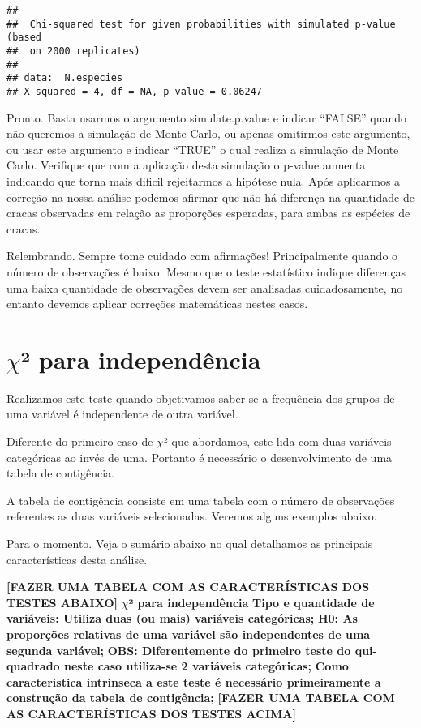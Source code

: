 \documentclass[titlepage, oneside, openany, a4paper]{book}
\begin{document}
\begin{verbatim}
## 
##  Chi-squared test for given probabilities with simulated p-value (based
##  on 2000 replicates)
## 
## data:  N.especies
## X-squared = 4, df = NA, p-value = 0.06247
\end{verbatim}

Pronto. Basta usarmos o argumento simulate.p.value e indicar ``FALSE'' quando não queremos a simulação de Monte Carlo, ou apenas omitirmos este argumento, ou usar este argumento e indicar ``TRUE'' o qual realiza a simulação de Monte Carlo. Verifique que com a aplicação desta simulação o p-value aumenta indicando que torna mais dificil rejeitarmos a hipótese nula. Após aplicarmos a correção na nossa análise podemos afirmar que não há diferença na quantidade de cracas observadas em relação as proporções esperadas, para ambas as espécies de cracas.

Relembrando. Sempre tome cuidado com afirmações! Principalmente quando o número de observações é baixo. Mesmo que o teste estatístico indique diferenças uma baixa quantidade de observações devem ser analisadas cuidadosamente, no entanto devemos aplicar correções matemáticas nestes casos.

\hypertarget{chi-para-independuxeancia}{%
\section{\texorpdfstring{\(\chi\)² para independência}{\textbackslash{}chi² para independência}}\label{chi-para-independuxeancia}}

Realizamos este teste quando objetivamos saber se a frequência dos grupos de uma variável é independente de outra variável.

Diferente do primeiro caso de \(\chi\)² que abordamos, este lida com duas variáveis categóricas ao invés de uma. Portanto é necessário o desenvolvimento de uma tabela de contigência.

A tabela de contigência consiste em uma tabela com o número de observações referentes as duas variáveis selecionadas. Veremos alguns exemplos abaixo.

Para o momento. Veja o sumário abaixo no qual detalhamos as principais características desta análise.

\textbf{{[}FAZER UMA TABELA COM AS CARACTERÍSTICAS DOS TESTES ABAIXO{]}}
\textbf{\(\chi\)² para independência}
\textbf{Tipo e quantidade de variáveis: Utiliza duas (ou mais) variáveis categóricas;}
\textbf{H0: As proporções relativas de uma variável são independentes de uma segunda variável;}
\textbf{OBS: Diferentemente do primeiro teste do qui-quadrado neste caso utiliza-se 2 variáveis categóricas;}
\textbf{Como caracteristica intrinseca a este teste é necessário primeiramente a construção da tabela de contigência;}
\textbf{{[}FAZER UMA TABELA COM AS CARACTERÍSTICAS DOS TESTES ACIMA{]}}
\end{document}
